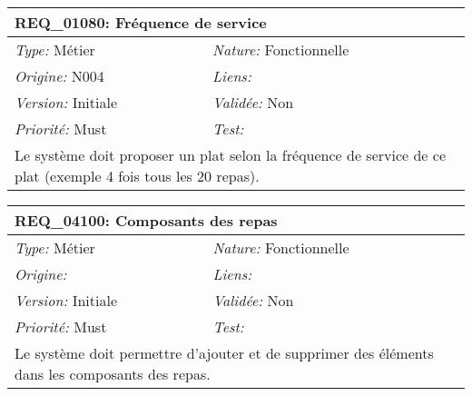 \begin{table}[!h]

\begin{tabular}{|p{60mm}p{100mm}|}

\hline

\multicolumn{2}{|l|}{\textbf{REQ\_01080:} Fréquence de service} \\ \hline

\emph{Type:} Métier & \emph{Nature:} Fonctionnelle \\

\emph{Origine:} N004 & \emph{Liens:}  \\

\emph{Version:} Initiale & \emph{Validée:} Non \\

\emph{Priorité:} Must & \emph{Test:} \\ \hline

\multicolumn{2}{|p{16cm}|}{Le système doit proposer un plat selon la fréquence de service de ce plat (exemple 4 fois tous les 20 repas).} \\ \hline

\end{tabular}

\end{table}



\begin{table}[!h]

\begin{tabular}{|p{60mm}p{100mm}|}

\hline

\multicolumn{2}{|l|}{\textbf{REQ\_04100:} Composants des repas} \\ \hline

\emph{Type:} Métier & \emph{Nature:} Fonctionnelle \\

\emph{Origine:}  & \emph{Liens:}  \\

\emph{Version:} Initiale & \emph{Validée:} Non \\

\emph{Priorité:} Must & \emph{Test:} \\ \hline

\multicolumn{2}{|p{16cm}|}{Le système doit permettre d'ajouter et de supprimer des éléments dans les composants des repas.} \\ \hline

\end{tabular}

\end{table}



